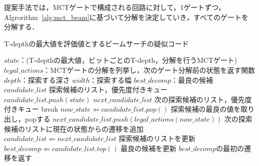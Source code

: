 提案手法では，MCTゲートで構成される回路に対して，1ゲートずつ，
Algrorithm~\ref{alg:mct_beam}に基づいて分解を決定していき，すべてのゲートを分解する．

\begin{algorithm}[tbp]
  \caption{T-depthの最大値を評価値とするビームサーチの疑似コード}
  \label{alg:mct_beam}
  \begin{algorithmic}[1]
    \Require $state$：(T-depthの最大値，ビットごとのT-depth，分解を行うMCTゲート)
    \Require $legal\_actions$：MCTゲートの分解を列挙し，次のゲート分解前の状態を返す関数
    \Require $depth$：探索する深さ
    \Require $width$：探索する幅
    \State $best\_decomp$：最良の候補
    \State $candidate\_list$ 探索候補のリスト，優先度付きキュー
    \State $candidate\_list.push(state)$
      \State $next\_candidate\_list$ 次の探索候補のリスト，優先度付きキュー
        \State break
      \EndIf
      \State $now\_state \Leftarrow candidate\_list.pop()$ 探索候補の最良の値を取り出し，popする
      \State $next\_candidate\_list.push(legal\_actions(now\_state))$ 次の探索候補のリストに現在の状態からの遷移を追加
      \EndFor
      \State $candidate\_list \Leftarrow next\_candidate\_list$ 探索候補のリストを更新
      \State $best\_decomp \Leftarrow candidate\_list.top()$ 最良の候補を更新
    \EndFor
    \State \Return $best\_decomp$の最初の遷移を返す
  \end{algorithmic}
\end{algorithm}

